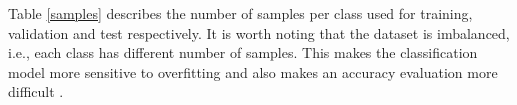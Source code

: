 \documentclass[journal,article,submit,pdftex,moreauthors]{Definitions/mdpi}
\begin{document}
Table \ref{samples} describes the number of samples per class used for training, validation and test respectively.
It is worth noting that the dataset is imbalanced, i.e., each class has different number of samples. This makes the classification model more sensitive to overfitting and also makes an accuracy evaluation more difficult \cite{Foody2002}.
\end{document}
